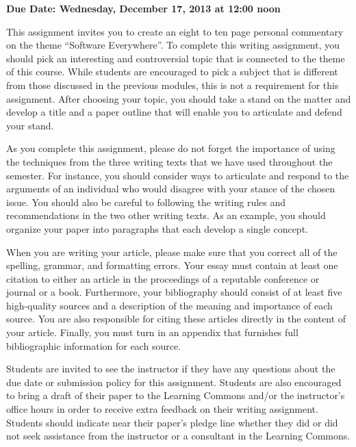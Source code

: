 

\usepackage[compact]{titlesec}



\vspace*{-.2in}
\begin{center}
	{\bf Due Date: Wednesday, December 17, 2013 at 12:00 noon}
\end{center}

This assignment invites you to create an eight to ten page personal commentary on the theme ``Software Everywhere''.  To
complete this writing assignment, you should pick an interesting and controversial topic that is connected to the theme
of this course.  While students are encouraged to pick a subject that is different from those discussed in the previous
modules, this is not a requirement for this assignment. After choosing your topic, you should take a stand on the
matter and develop a title and a paper outline that will enable you to articulate and defend your stand.

As you complete this assignment, please do not forget the importance of using the techniques from the three writing
texts that we have used throughout the semester. For instance, you should consider ways to articulate and respond to the
arguments of an individual who would disagree with your stance of the chosen issue. You should also be careful to
following the writing rules and recommendations in the two other writing texts.  As an example, you should organize your
paper into paragraphs that each develop a single concept. 

When you are writing your article, please make sure that you correct all of the spelling, grammar, and formatting
errors. Your essay must contain at least one citation to either an article in the proceedings of a reputable conference
or journal or a book. Furthermore, your bibliography should consist of at least five high-quality sources and a
description of the meaning and importance of each source. You are also responsible for citing these articles directly in
the content of your article. Finally, you must turn in an appendix that furnishes full bibliographic information for
each source.

Students are invited to see the instructor if they have any questions about the due date or submission policy for
this assignment. Students are also encouraged to bring a draft of their paper to the Learning Commons and/or
the instructor's office hours in order to receive extra feedback on their writing assignment. Students should indicate
near their paper's pledge line whether they did or did not seek assistance from the instructor or a consultant in
the Learning Commons.


